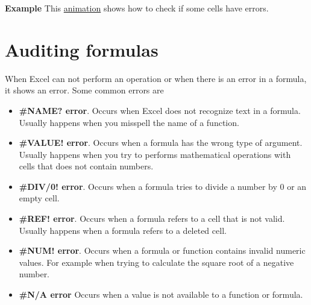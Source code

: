 \textbf{Example} This \href{http://aprendeconalf.es/office/excel/manual/img/example_function_iserror.gif}{animation}
shows how to check if some cells have errors.


% 
% 
% 
% 


\section{Auditing formulas}\hypertarget{auditing-formulas}{}\label{auditing-formulas}

When Excel can not perform an operation or when there is an error in a formula, it shows an error. Some common errors are

\begin{itemize}
\item \textbf{\#NAME? error}. Occurs when Excel does not recognize text in a formula. Usually happens when you misspell the name of a function.
\item \textbf{\#VALUE! error}. Occurs when a formula has the wrong type of argument. Usually happens when you try to performs mathematical operations with cells that does not contain numbers.
\item \textbf{\#DIV/0! error}. Occurs when a formula tries to divide a number by 0 or an empty cell.
\item \textbf{\#REF! error}. Occurs when a formula refers to a cell that is not valid. Usually happens when a formula refers to a deleted cell.
\item \textbf{\#NUM! error}. Occurs when a formula or function contains invalid numeric values. For example when trying to calculate the square root of a negative number.
\item \textbf{\#N\slash A error} Occurs when a value is not available to a function or formula.
\end{itemize}

